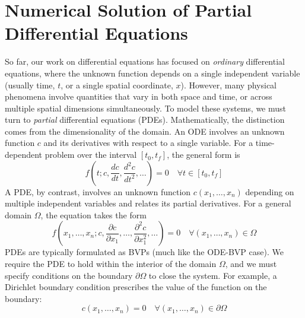 \chapter{Numerical Solution of Partial Differential Equations}

So far, our work on differential equations has focused on \textit{ordinary} differential equations, where the unknown function depends on a single independent variable (usually time, $t$, or a single spatial coordinate, $x$). However, many physical phenomena involve quantities that vary in both space and time, or across multiple spatial dimensions simultaneously. To model these systems, we must turn to \textit{partial} differential equations (PDEs). Mathematically, the distinction comes from the dimensionality of the domain. An ODE involves an unknown function $c$ and its derivatives with respect to a single variable. For a time-dependent problem over the interval $[t_0, t_f]$, the general form is
\begin{equation}
    f\left(t; c, \frac{dc}{dt}, \frac{d^2c}{dt^2}, \dots \right) = 0 \quad \forall t \in [t_0, t_f]
\end{equation}
A PDE, by contrast, involves an unknown function $c(x_1, \dots, x_n)$ depending on multiple independent variables and relates its partial derivatives. For a general domain $\Omega$, the equation takes the form
\begin{equation}
    f\left(x_1, \dots, x_n; c, \frac{\partial c}{\partial x_1}, \dots, \frac{\partial^2 c}{\partial x_1^2}, \dots \right) = 0 \quad \forall (x_1, \dots, x_n) \in \Omega
\end{equation}
PDEs are typically formulated as BVPs (much like the ODE-BVP case). We require the PDE to hold within the interior of the domain $\Omega$, and we must specify conditions on the boundary $\partial \Omega$ to close the system. For example, a Dirichlet boundary condition prescribes the value of the function on the boundary:
\begin{equation}
    c(x_1, \dots, x_n) = 0 \quad \forall (x_1, \dots, x_n) \in \partial \Omega
\end{equation}

